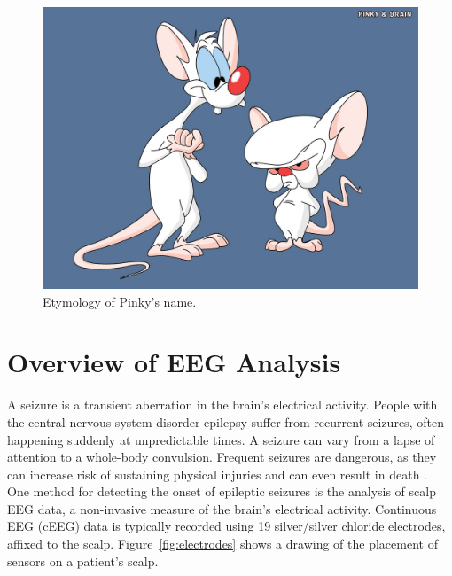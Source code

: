 \begin{figure}[h]
\begin{center}
\includegraphics[scale=0.5]{./img/pinky-and-the-brain.png}
\caption{Etymology of Pinky's name.}
\label{fig:pinky-and-the-brain}
\end{center}
\end{figure}

\section{Overview of EEG Analysis}\label{intro-ch:eeg-overview}

A seizure is a transient aberration in the brain's electrical activity. People
with the central nervous system disorder epilepsy suffer from recurrent
seizures, often happening suddenly at unpredictable times. A seizure can vary
from a lapse of attention to a whole-body convulsion. Frequent seizures are
dangerous, as they can increase risk of sustaining physical injuries and can
even result in death \cite{eeg-ml}. \\

One method for detecting the onset of epileptic seizures is the analysis of
scalp EEG data, a non-invasive measure of the brain's electrical activity.
Continuous EEG (cEEG) data is typically recorded using 19 silver/silver
chloride electrodes, affixed to the scalp\cite{ceeg-1}.
Figure~\ref{fig:electrodes} shows a drawing of the placement of sensors on a
patient's scalp. \\

